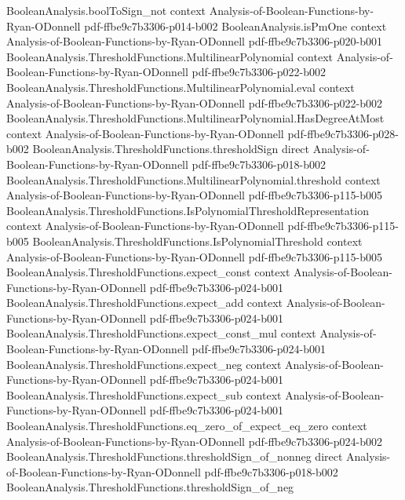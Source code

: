 \begin{theorem}
  {BooleanAnalysis.boolToSign_not}
  {context}
  {Analysis-of-Boolean-Functions-by-Ryan-ODonnell}
  {pdf-ffbe9c7b3306-p014-b002}
\proofstep
  {BooleanAnalysis.isPmOne}
  {context}
  {Analysis-of-Boolean-Functions-by-Ryan-ODonnell}
  {pdf-ffbe9c7b3306-p020-b001}
\proofstep
  {BooleanAnalysis.ThresholdFunctions.MultilinearPolynomial}
  {context}
  {Analysis-of-Boolean-Functions-by-Ryan-ODonnell}
  {pdf-ffbe9c7b3306-p022-b002}
\proofstep
  {BooleanAnalysis.ThresholdFunctions.MultilinearPolynomial.eval}
  {context}
  {Analysis-of-Boolean-Functions-by-Ryan-ODonnell}
  {pdf-ffbe9c7b3306-p022-b002}
\proofstep
  {BooleanAnalysis.ThresholdFunctions.MultilinearPolynomial.HasDegreeAtMost}
  {context}
  {Analysis-of-Boolean-Functions-by-Ryan-ODonnell}
  {pdf-ffbe9c7b3306-p028-b002}
\proofstep
  {BooleanAnalysis.ThresholdFunctions.thresholdSign}
  {direct}
  {Analysis-of-Boolean-Functions-by-Ryan-ODonnell}
  {pdf-ffbe9c7b3306-p018-b002}
\proofstep
  {BooleanAnalysis.ThresholdFunctions.MultilinearPolynomial.threshold}
  {context}
  {Analysis-of-Boolean-Functions-by-Ryan-ODonnell}
  {pdf-ffbe9c7b3306-p115-b005}
\proofstep
  {BooleanAnalysis.ThresholdFunctions.IsPolynomialThresholdRepresentation}
  {context}
  {Analysis-of-Boolean-Functions-by-Ryan-ODonnell}
  {pdf-ffbe9c7b3306-p115-b005}
\proofstep
  {BooleanAnalysis.ThresholdFunctions.IsPolynomialThreshold}
  {context}
  {Analysis-of-Boolean-Functions-by-Ryan-ODonnell}
  {pdf-ffbe9c7b3306-p115-b005}
\proofstep
  {BooleanAnalysis.ThresholdFunctions.expect_const}
  {context}
  {Analysis-of-Boolean-Functions-by-Ryan-ODonnell}
  {pdf-ffbe9c7b3306-p024-b001}
\proofstep
  {BooleanAnalysis.ThresholdFunctions.expect_add}
  {context}
  {Analysis-of-Boolean-Functions-by-Ryan-ODonnell}
  {pdf-ffbe9c7b3306-p024-b001}
\proofstep
  {BooleanAnalysis.ThresholdFunctions.expect_const_mul}
  {context}
  {Analysis-of-Boolean-Functions-by-Ryan-ODonnell}
  {pdf-ffbe9c7b3306-p024-b001}
\proofstep
  {BooleanAnalysis.ThresholdFunctions.expect_neg}
  {context}
  {Analysis-of-Boolean-Functions-by-Ryan-ODonnell}
  {pdf-ffbe9c7b3306-p024-b001}
\proofstep
  {BooleanAnalysis.ThresholdFunctions.expect_sub}
  {context}
  {Analysis-of-Boolean-Functions-by-Ryan-ODonnell}
  {pdf-ffbe9c7b3306-p024-b001}
\proofstep
  {BooleanAnalysis.ThresholdFunctions.eq_zero_of_expect_eq_zero}
  {context}
  {Analysis-of-Boolean-Functions-by-Ryan-ODonnell}
  {pdf-ffbe9c7b3306-p024-b002}
\proofstep
  {BooleanAnalysis.ThresholdFunctions.thresholdSign_of_nonneg}
  {direct}
  {Analysis-of-Boolean-Functions-by-Ryan-ODonnell}
  {pdf-ffbe9c7b3306-p018-b002}
\proofstep
  {BooleanAnalysis.ThresholdFunctions.thresholdSign_of_neg}

\end{theorem}
